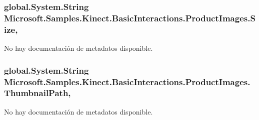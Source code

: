 \hypertarget{class_microsoft_1_1_samples_1_1_kinect_1_1_basic_interactions_1_1_product_images_a4f97ce75e8cfce389fd2bda791e24519}{
\subsubsection[{Size}]{\setlength{\rightskip}{0pt plus 5cm}global.\-System.\-String Microsoft.\-Samples.\-Kinect.\-Basic\-Interactions.\-Product\-Images.\-Size\hspace{0.3cm}{\ttfamily [get]}, {\ttfamily [set]}}}\label{class_microsoft_1_1_samples_1_1_kinect_1_1_basic_interactions_1_1_product_images_a4f97ce75e8cfce389fd2bda791e24519}


No hay documentación de metadatos disponible. 

\hypertarget{class_microsoft_1_1_samples_1_1_kinect_1_1_basic_interactions_1_1_product_images_a5704c72d2877381606844aceac5188d8}{
\subsubsection[{Thumbnail\-Path}]{\setlength{\rightskip}{0pt plus 5cm}global.\-System.\-String Microsoft.\-Samples.\-Kinect.\-Basic\-Interactions.\-Product\-Images.\-Thumbnail\-Path\hspace{0.3cm}{\ttfamily [get]}, {\ttfamily [set]}}}\label{class_microsoft_1_1_samples_1_1_kinect_1_1_basic_interactions_1_1_product_images_a5704c72d2877381606844aceac5188d8}


No hay documentación de metadatos disponible. 

